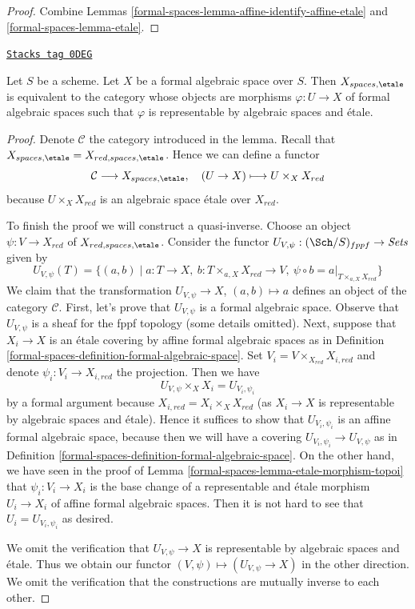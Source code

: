 \begin{proof}
Combine Lemmas \ref{formal-spaces-lemma-affine-identify-affine-etale} and \ref{formal-spaces-lemma-etale}.
\end{proof}

\begin{lemma}
\label{formal-spaces-lemma-identify-spaces-etale}
\href{https://stacks.math.columbia.edu/tag/0DEG}{\texttt{Stacks tag 0DEG}}

Let $S$ be a scheme. Let $X$ be a formal algebraic space over $S$.
Then $X_{spaces, \etale}$ is equivalent to the category whose objects
are morphisms $\varphi : U \to X$ of formal algebraic spaces such that
$\varphi$ is representable by algebraic spaces and \'etale.
\end{lemma}

\begin{proof}
Denote $\mathcal{C}$ the category introduced in the lemma.
Recall that $X_{spaces, \etale} = X_{red, spaces, \etale}$.
Hence we can define a functor
$$
\mathcal{C} \longrightarrow X_{spaces, \etale},\quad
(U \to X) \longmapsto U \times_X X_{red}
$$
because $U \times_X X_{red}$ is an algebraic space \'etale over $X_{red}$.

\medskip\noindent
To finish the proof we will construct a quasi-inverse.
Choose an object $\psi : V \to X_{red}$ of $X_{red, spaces, \etale}$.
Consider the functor
$U_{V, \psi} : (\Sch/S)_{fppf} \to \textit{Sets}$ given by
$$
U_{V, \psi}(T) = \{(a, b) \mid
a : T \to X,
\ b : T \times_{a, X} X_{red} \to V,
\ \psi \circ b = a|_{T \times_{a, X} X_{red}}\}
$$
We claim that the transformation $U_{V, \psi} \to X$, $(a, b) \mapsto a$
defines an object of the category $\mathcal{C}$.
First, let's prove that $U_{V, \psi}$ is a formal algebraic space.
Observe that $U_{V, \psi}$ is a sheaf for the fppf topology (some details
omitted). Next, suppose that $X_i \to X$ is an \'etale covering by
affine formal algebraic spaces as in
Definition \ref{formal-spaces-definition-formal-algebraic-space}.
Set $V_i = V \times_{X_{red}} X_{i, red}$ and denote
$\psi_i : V_i \to X_{i, red}$ the projection. Then
we have
$$
U_{V, \psi} \times_X X_i = U_{V_i, \psi_i}
$$
by a formal argument because $X_{i, red} = X_i \times_X X_{red}$
(as $X_i \to X$ is representable by algebraic spaces and \'etale).
Hence it suffices to show that $U_{V_i, \psi_i}$ is an
affine formal algebraic space, because then we will have
a covering $U_{V_i, \psi_i} \to U_{V, \psi}$ as in
Definition \ref{formal-spaces-definition-formal-algebraic-space}.
On the other hand, we have seen in the proof of
Lemma \ref{formal-spaces-lemma-etale-morphism-topoi}
that $\psi_i : V_i \to X_i$ is the base
change of a representable and \'etale morphism
$U_i \to X_i$ of affine formal algebraic spaces.
Then it is not hard to see that $U_i = U_{V_i, \psi_i}$
as desired.

\medskip\noindent
We omit the verification that $U_{V, \psi} \to X$
is representable by algebraic spaces and \'etale.
Thus we obtain our functor $(V, \psi) \mapsto (U_{V, \psi} \to X)$
in the other direction.
We omit the verification that the constructions
are mutually inverse to each other.
\end{proof}

